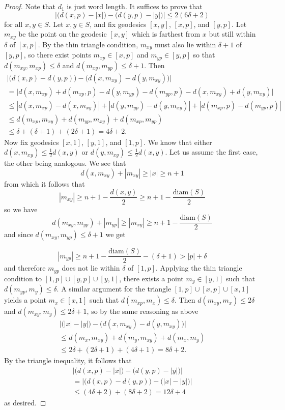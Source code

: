 \documentclass[11pt,letterpaper]{amsart}
\theoremstyle{definition}
\begin{document}
\begin{proof}
Note that $d_1$ is just word length.  It suffices to prove that
\[
\bigl|\bigl( d(x,p) - |x|\bigr) - \bigl(d(y,p)-|y|\bigr)\bigr| \leq 2(6\delta+2)
\]
for all $x,y\in S$.  Let $x,y\in S$, and fix geodesics $[x,y]$, $[x,p]$, and $[y,p]$. Let $m_{xy}$ be the point on the geodesic $[x,y]$ which is farthest from $x$ but still within $\delta$ of $[x,p]$.  By the thin triangle condition, $m_{xy}$ must also lie within $\delta+1$ of $[y,p]$,
so there exist points $m_{xp}\in [x,p]$ and $m_{yp}\in [y,p]$ so that $d(m_{xy},m_{xp})\leq \delta$ and $d(m_{xy},m_{yp})\leq \delta+1$. Then
\begin{multline*}
\bigl|\bigl(d(x,p)-d(y,p)\bigr) - \bigl(d(x,m_{xy}) - d(y,m_{xy})\bigr)\bigr| \\
= \bigl|d(x,m_{xp}) + d(m_{xp},p) - d(y,m_{yp}) - d(m_{yp},p) - d(x,m_{xy}) + d(y,m_{xy})\bigr| \\
\leq |d(x,m_{xp})-d(x,m_{xy})| + |d(y,m_{yp})-d(y,m_{xy})| +|d(m_{xp},p)-d(m_{yp},p)| \\
\leq d(m_{xp},m_{xy}) + d(m_{yp},m_{xy}) + d(m_{xp},m_{yp}) \\ \leq \delta + (\delta+1) + (2\delta+1) = 4\delta+2.
\end{multline*}
Now fix geodesics $[x,1]$, $[y,1]$, and $[1,p]$.  We know that either $d(x,m_{xy}) \le \frac{1}{2} d(x,y)$ or $d(y,m_{xy}) \le \frac{1}{2}d(x,y)$. Let us assume the first case, the other being analogous. We see that
\[
d(x,m_{xy})+|m_{xy}| \ge |x| \ge n+1
\]
from which it follows that
\[
|m_{xy}| \geq n+1-\frac{d(x,y)}{2} \geq n+1 - \frac{\mathrm{diam}(S)}{2}
\]
so we have
\[
d(m_{xy},m_{yp})+|m_{yp}| \ge |m_{xy}| \ge n+1 - \frac{\mathrm{diam}(S)}{2}
\]
and since $d(m_{xy},m_{yp}) \le \delta+1$ we get

\[
|m_{yp}| \geq n+1-\frac{\mathrm{diam}(S)}{2} - (\delta+1) > |p|+\delta
\]
and therefore $m_{yp}$ does not lie within $\delta$ of $[1,p]$.  Applying the thin triangle condition to $[1,p]\cup [y,p]\cup [y,1]$, there exists a point $m_{y}\in[y,1]$ such that $d(m_{yp},m_{y})\leq \delta$. A similar argument for the triangle $[1,p]\cup [x,p]\cup [x,1]$ yields a point $m_{x}\in [x,1]$ such that $d(m_{xp},m_{x})\leq \delta$.  Then $d(m_{xy},m_{x})\leq 2\delta$ and $d(m_{xy},m_{y})\leq 2\delta+1$, so by the same reasoning as above
\begin{multline*}
\bigl|\bigl(|x|-|y|\bigr) - \bigl(d(x,m_{xy}) - d(y,m_{xy})\bigr)\bigr| \\
\leq d(m_{x},m_{xy}) + d(m_{y},m_{xy}) + d(m_{x},m_{y}) \\
\leq 2\delta + (2\delta+1) + (4\delta+1) = 8\delta+2.
\end{multline*}
By the triangle inequality, it follows that
\begin{multline*}
\bigl|\bigl( d(x,p) - |x|\bigr) - \bigl(d(y,p)-|y|\bigr)\bigr| \\ =
\bigl|\bigl(d(x,p)-d(y,p)\bigr) - \bigl(|x| - |y|\bigr)\bigr| \\ \leq (4\delta+2)+ (8\delta + 2) = 12\delta + 4
\end{multline*}
as desired.
\end{proof}
\end{document}
